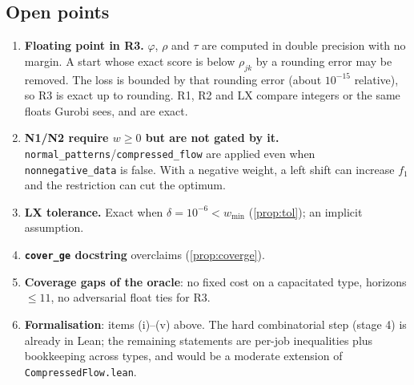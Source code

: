 \documentclass[11pt,a4paper]{article}
\newcommand{\code}[1]{\texttt{#1}}
\begin{document}
\subsection{Open points}

\begin{enumerate}[label=G\arabic*.]
\item \textbf{Floating point in R3.} $\varphi$, $\rho$ and $\tau$ are computed
  in double precision with no margin. A start whose exact score is below
  $\rho_{jk}$ by a rounding error may be removed. The loss is bounded by that
  rounding error (about $10^{-15}$ relative), so R3 is exact up to rounding.
  R1, R2 and LX compare integers or the same floats Gurobi sees, and are exact.
\item \textbf{N1/N2 require $w\ge0$ but are not gated by it.}
  \code{normal\_patterns}/\code{compressed\_flow} are applied even when
  \code{nonnegative\_data} is false. With a negative weight, a left shift can
  increase $f_1$ and the restriction can cut the optimum.
\item \textbf{LX tolerance.} Exact when $\delta=10^{-6}<w_{\min}$
  (\cref{prop:tol}); an implicit assumption.
\item \textbf{\code{cover\_ge} docstring} overclaims (\cref{prop:coverge}).
\item \textbf{Coverage gaps of the oracle}: no fixed cost on a capacitated
  type, horizons $\le11$, no adversarial float ties for R3.
\item \textbf{Formalisation}: items (i)--(v) above. The hard combinatorial
  step (stage 4) is already in Lean; the remaining statements are
  per-job inequalities plus bookkeeping across types, and would be a
  moderate extension of \code{CompressedFlow.lean}.
\end{enumerate}
\end{document}
